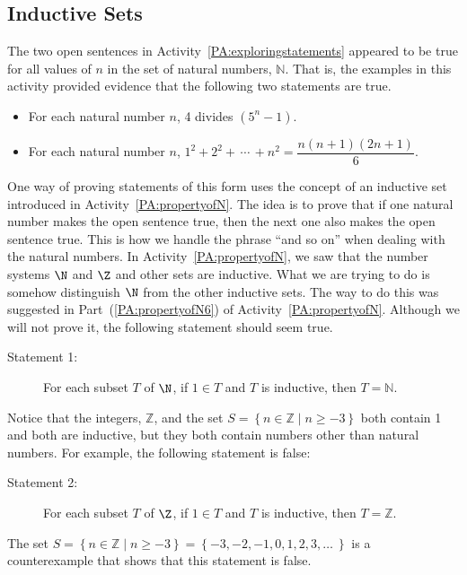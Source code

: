 \subsection*{Inductive Sets}
The two open sentences in \typeu Activity~\ref*{PA:exploringstatements} appeared to be true for all values of  $n$  in the set of natural numbers, $\mathbb{N}$.  That is, the examples in this \typel activity provided evidence that the following two statements are true.  

\begin{itemize}
\item For each natural number $n$,  4  divides  $\left( {5^n  - 1} \right)$. \label{conjecture1}
\item For each natural number  $n$, $1^2  + 2^2  + \, \cdots \, + n^2  = \dfrac{{n(n + 1)(2n + 1)}}{6}$. \label{conjecture2}
\end{itemize}
One way of proving statements of this form uses the concept of an inductive set introduced in \typeu Activity~\ref*{PA:propertyofN}.  The idea is to prove that if one natural number makes the open sentence true, then the next one also makes the open sentence true.  This is how we handle the phrase ``and so on'' when dealing with the natural numbers.
%
In \typeu Activity~\ref*{PA:propertyofN}, we saw that the number systems $\N$  and  $\Z$ and other sets are inductive.  What we are trying to do is somehow distinguish  $\N$ from the other inductive sets.  The way to do this was suggested in Part~(\ref{PA:propertyofN6}) of \typeu Activity~\ref*{PA:propertyofN}.  Although we will not prove it, the following statement should seem true.

\begin{description}
\item [Statement 1:] For each subset  $T$ of $\N$,  if  $1 \in T$  and  $T$  is inductive, then  $T = \mathbb{N}$. \label{inductivestatement1}
\end{description}
Notice that the integers,  $\mathbb{Z}$, and the set  
$S = \left\{ {n \in \mathbb{Z} \mid n \geq  - 3} \right\}$ both contain  1  and both are inductive, but they both contain numbers other than natural numbers.  For example, the following statement is false:

\begin{description}
\item [Statement 2:] For each subset $T$ of $\Z$, if  $1 \in T$  and  $T$  is inductive, then  $T = \mathbb{Z}$. \label{inductivestatement2}
\end{description}
The set  $S = \left\{ {n \in \mathbb{Z} \mid n \geq  - 3} \right\} = \left\{ { -3, -2, -1,0,1,2,3, \ldots \: } \right\}$ is a counterexample that shows that this statement is false.
%

